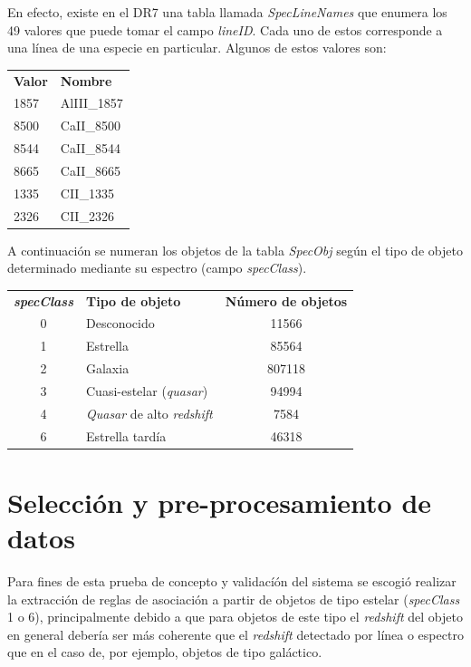 En efecto, existe en el DR7 una tabla llamada \textit{SpecLineNames} que enumera los 49 valores que puede tomar el campo \textit{lineID}. Cada uno de estos corresponde a una línea de una especie en particular. Algunos de estos valores son:

\begin{tabular}{l l}
\textbf{Valor} & \textbf{Nombre} \\
1857 & AlIII\_1857 \\
8500 & CaII\_8500 \\
8544 & CaII\_8544 \\
8665 & CaII\_8665 \\
1335 & CII\_1335 \\
2326 & CII\_2326 \\
\end{tabular}

A continuación se numeran los objetos de la tabla \textit{SpecObj} según el tipo de objeto determinado mediante su espectro (campo \textit{specClass}).

\begin{tabular}{c l c}
\textbf{\textit{specClass}} & \textbf{Tipo de objeto} & \textbf{Número de objetos}\\
0 & Desconocido & 11566 \\
1 & Estrella & 85564 \\
2 & Galaxia & 807118 \\
3 & Cuasi-estelar (\textit{quasar}) & 94994 \\
4 & \textit{Quasar} de alto \textit{redshift} & 7584 \\
6 & Estrella tardía & 46318 \\
\end{tabular}

\section{Selección y pre-procesamiento de datos}


Para fines de esta prueba de concepto y validacíón del sistema se escogió realizar la extracción de reglas de asociación a partir de objetos de tipo estelar (\textit{specClass} 1 o 6), principalmente debido a que para objetos de este tipo el \textit{redshift} del objeto en general debería ser más coherente que el \textit{redshift} detectado por línea o espectro que en el caso de, por ejemplo, objetos de tipo galáctico.

